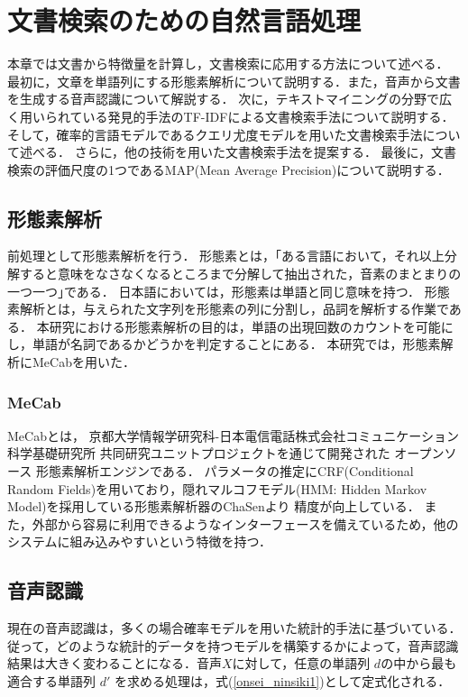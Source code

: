 \chapter{文書検索のための自然言語処理}
本章では文書から特徴量を計算し，文書検索に応用する方法について述べる．
最初に，文章を単語列にする形態素解析について説明する．また，音声から文書を生成する音声認識について解説する．
次に，テキストマイニングの分野で広く用いられている発見的手法のTF-IDFによる文書検索手法について説明する．
そして，確率的言語モデルであるクエリ尤度モデルを用いた文書検索手法について述べる．
さらに，他の技術を用いた文書検索手法を提案する．
最後に，文書検索の評価尺度の1つであるMAP(Mean Average Precision)について説明する．

\section{形態素解析}
前処理として形態素解析を行う．
形態素とは，｢ある言語において，それ以上分解すると意味をなさなくなるところまで分解して抽出された，音素のまとまりの一つ一つ｣である．
日本語においては，形態素は単語と同じ意味を持つ．
形態素解析とは，与えられた文字列を形態素の列に分割し，品詞を解析する作業である．
本研究における形態素解析の目的は，単語の出現回数のカウントを可能にし，単語が名詞であるかどうかを判定することにある．
本研究では，形態素解析にMeCab\cite{MeCab}を用いた．

\subsection{MeCab}
MeCabとは， 京都大学情報学研究科-日本電信電話株式会社コミュニケーション科学基礎研究所 共同研究ユニットプロジェクトを通じて開発された
オープンソース 形態素解析エンジンである．
パラメータの推定にCRF(Conditional Random Fields)を用いており，隠れマルコフモデル(HMM: Hidden Markov Model)を採用している形態素解析器のChaSen\cite{ChaSen}より
精度が向上している．
また，外部から容易に利用できるようなインターフェースを備えているため，他のシステムに組み込みやすいという特徴を持つ．

% 
%

\section{音声認識}
現在の音声認識は，多くの場合確率モデルを用いた統計的手法に基づいている．従って，どのような統計的データを持つモデルを構築するかによって，音声認識結果は大きく変わることになる．音声$X$に対して，任意の単語列 $d$の中から最も適合する単語列 $d'$ を求める処理は，式(\ref{onsei_ninsiki1})として定式化される．\\

